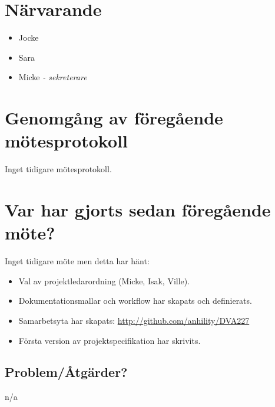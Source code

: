 
\section*{Närvarande}
\begin{itemize}[noitemsep]
    \item Jocke
    \item Sara
    \item Micke \textit{- sekreterare}
\end{itemize}

\section*{Genomgång av föregående mötesprotokoll}
Inget tidigare mötesprotokoll.

\section*{Var har gjorts sedan föregående möte?}
Inget tidigare möte men detta har hänt:
\begin{itemize}[noitemsep]
    \item Val av projektledarordning (Micke, Isak, Ville).
    \item Dokumentationsmallar och workflow har skapats och definierats.
    \item Samarbetsyta har skapats: \url{http://github.com/anhility/DVA227}
    \item Första version av projektspecifikation har skrivits.
\end{itemize}

\subsection*{Problem/Åtgärder?}
n/a

